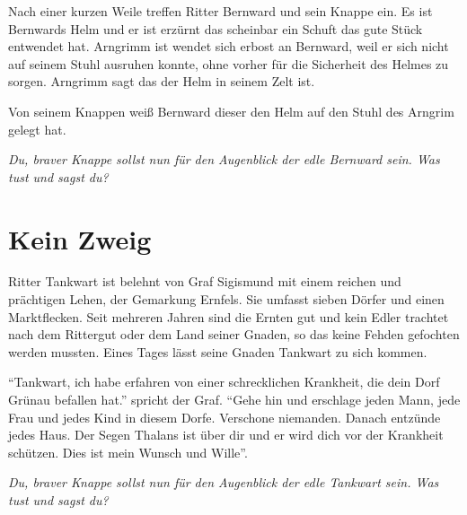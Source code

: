 \documentclass[twocolumn, pdftex, 12pt]{book}
\begin{document}
Nach einer kurzen Weile treffen Ritter Bernward und sein Knappe ein.
Es ist Bernwards Helm und er ist erzürnt das scheinbar ein Schuft das gute
Stück entwendet hat. Arngrimm ist wendet sich erbost an Bernward, weil er sich
nicht auf seinem Stuhl ausruhen konnte, ohne vorher für die Sicherheit des
Helmes zu sorgen. Arngrimm sagt das der Helm in seinem Zelt ist.

Von seinem Knappen weiß Bernward dieser den Helm auf den Stuhl des Arngrim
gelegt hat.

\emph{Du, braver Knappe sollst nun für den Augenblick der edle Bernward sein. Was
tust und sagst du?}

\chapter{Kein Zweig}

Ritter Tankwart ist belehnt von Graf Sigismund mit einem reichen und prächtigen
Lehen, der Gemarkung Ernfels. Sie umfasst sieben Dörfer und einen Marktflecken.
Seit mehreren Jahren sind die Ernten gut und kein Edler trachtet nach dem
Rittergut oder dem Land seiner Gnaden, so das keine Fehden gefochten werden
mussten. Eines Tages lässt seine Gnaden Tankwart zu sich kommen.

``Tankwart, ich habe erfahren von einer schrecklichen Krankheit, die dein Dorf
Grünau befallen hat.'' spricht der Graf. ``Gehe hin und erschlage jeden Mann,
jede Frau und jedes Kind in diesem Dorfe. Verschone niemanden. Danach
entzünde jedes Haus. Der Segen Thalans ist über dir und er wird dich vor der
Krankheit schützen. Dies ist mein Wunsch und Wille''.

\emph{Du, braver Knappe sollst nun für den Augenblick der edle Tankwart sein.
Was tust und sagst du?}
\end{document}
